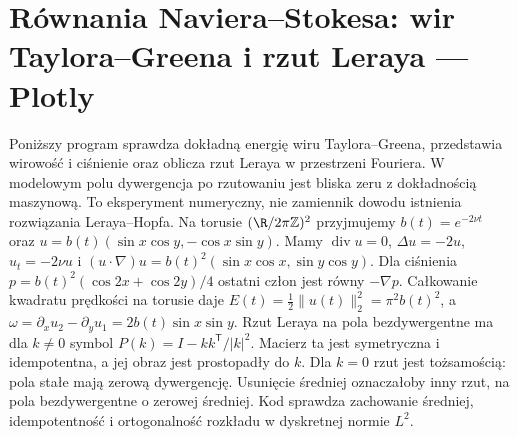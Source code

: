 \section{Równania Naviera--Stokesa: wir Taylora--Greena i rzut Leraya — Plotly}
\label{sec:pde28-code}
Poniższy program sprawdza dokładną energię wiru Taylora--Greena,
przedstawia wirowość i ciśnienie oraz oblicza rzut Leraya
w przestrzeni Fouriera. W modelowym polu dywergencja po rzutowaniu
jest bliska zeru z dokładnością maszynową. To eksperyment numeryczny,
nie zamiennik dowodu istnienia rozwiązania Leraya--Hopfa.
Na torusie $(\R/2\pi\mathbb Z)^2$ przyjmujemy
$b(t)=e^{-2\nu t}$ oraz
$u=b(t)(\sin x\cos y,-\cos x\sin y)$.
Mamy $\operatorname{div}u=0$, $\Delta u=-2u$,
$u_t=-2\nu u$ i
$(u\cdot\nabla)u=b(t)^2(\sin x\cos x,\sin y\cos y)$.
Dla ciśnienia $p=b(t)^2(\cos2x+\cos2y)/4$
ostatni człon jest równy $-\nabla p$.
Całkowanie kwadratu prędkości na torusie daje
$E(t)=\frac12\|u(t)\|_2^2=\pi^2 b(t)^2$,
a $\omega=\partial_xu_2-\partial_yu_1=2b(t)\sin x\sin y$.
Rzut Leraya na pola bezdywergentne ma dla $k\ne0$
symbol $P(k)=I-kk^{\mathsf T}/|k|^2$.
Macierz ta jest symetryczna i idempotentna,
a jej obraz jest prostopadły do $k$.
Dla $k=0$ rzut jest tożsamością: pola stałe mają
zerową dywergencję. Usunięcie średniej oznaczałoby
inny rzut, na pola bezdywergentne o zerowej średniej.
Kod sprawdza zachowanie średniej, idempotentność
i ortogonalność rozkładu w dyskretnej normie $L^2$.
